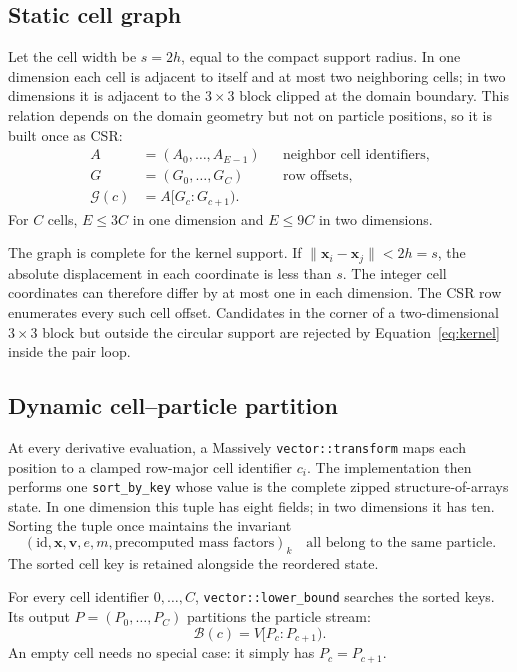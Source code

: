 \documentclass[a4paper,10pt]{article}
\newcommand{\code}[1]{\texttt{#1}}
\begin{document}
\subsection{Static cell graph}

Let the cell width be $s=2h$, equal to the compact support radius.  In one
dimension each cell is adjacent to itself and at most two neighboring cells; in
two dimensions it is adjacent to the $3\times3$ block clipped at the domain
boundary.  This relation depends on the domain geometry but not on particle
positions, so it is built once as CSR:
\begin{align}
 A &= (A_0,\ldots,A_{E-1}) &&\text{neighbor cell identifiers},\\
 G &= (G_0,\ldots,G_C) &&\text{row offsets},\\
 \mathcal{G}(c) &= A[G_c:G_{c+1}).
\end{align}
For $C$ cells, $E\le3C$ in one dimension and $E\le9C$ in two dimensions.

The graph is complete for the kernel support.  If
$\lVert\mathbf{x}_i-\mathbf{x}_j\rVert<2h=s$, the absolute displacement in each
coordinate is less than $s$.  The integer cell coordinates can therefore differ
by at most one in each dimension.  The CSR row enumerates every such cell offset.
Candidates in the corner of a two-dimensional $3\times3$ block but outside the
circular support are rejected by Equation~\eqref{eq:kernel} inside the pair loop.

\subsection{Dynamic cell--particle partition}

At every derivative evaluation, a Massively \code{vector::transform} maps each
position to a clamped row-major cell identifier $c_i$.  The implementation then
performs one \code{sort\_by\_key} whose value is the complete zipped
structure-of-arrays state.  In one dimension this tuple has eight fields; in two
dimensions it has ten.  Sorting the tuple once maintains the invariant
\begin{equation}
  (\mathrm{id},\mathbf{x},\mathbf{v},e,m,\text{precomputed mass factors})_k
  \quad\text{all belong to the same particle.}
\end{equation}
The sorted cell key is retained alongside the reordered state.

For every cell identifier $0,\ldots,C$, \code{vector::lower\_bound} searches the
sorted keys.  Its output
$P=(P_0,\ldots,P_C)$ partitions the particle stream:
\begin{equation}
 \mathcal{B}(c)=V[P_c:P_{c+1}).
 \label{eq:cell-particles}
\end{equation}
An empty cell needs no special case: it simply has $P_c=P_{c+1}$.
\end{document}
